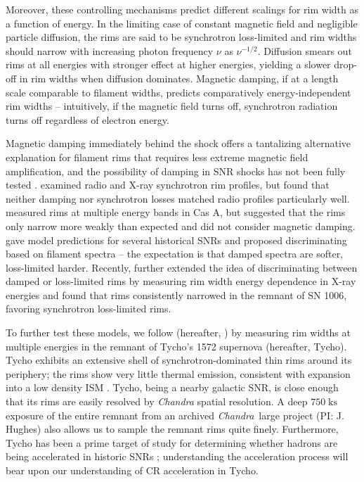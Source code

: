 \documentclass[iop, apj, numberedappendix, twocolappendix]{emulateapj}
\newcommand*{\mt}{\mathrm}
\newcommand*{\unit}[1]{\;\mt{#1}}  %
\newcommand*{\Chandra}{\textit{Chandra}\ }
\begin{document}
Moreover, these controlling mechanisms predict different scalings for rim width
as a function of energy.  In the limiting case of constant magnetic field and
negligible particle diffusion, the rims are said to be synchrotron loss-limited
and rim widths should narrow with increasing photon frequency $\nu$ as
$\nu^{-1/2}$. Diffusion smears out rims at all energies with stronger effect at
higher energies, yielding a slower drop-off in rim widths when diffusion
dominates.  Magnetic damping, if at a length scale comparable to filament
widths, predicts comparatively energy-independent rim widths -- intuitively, if
the magnetic field turns off, synchrotron radiation turns off regardless of
electron energy.

Magnetic damping immediately behind the shock offers a tantalizing alternative
explanation for filament rims that requires less extreme magnetic field
amplification, and the possibility of damping in SNR shocks has not been fully
tested \citep{pohl2005, marcowith2010}.  \citet{cassam-chenai2007} examined
radio and X-ray synchrotron rim profiles, but found that neither damping nor
synchrotron losses matched radio profiles particularly well.  \citet{araya2010}
measured rims at multiple energy bands in Cas A, but suggested that the rims
only narrow more weakly than expected and did not consider magnetic damping.
\citet{rettig2012} gave model predictions for several historical SNRs and
proposed discriminating based on filament spectra -- the expectation is that
damped spectra are softer, loss-limited harder.  Recently, \citet{ressler2014}
further extended the idea of discriminating between damped or loss-limited
rims by measuring rim width energy dependence in X-ray energies and found that
rims consistently narrowed in the remnant of SN 1006, favoring synchrotron
loss-limited rims.

To further test these models, we follow \citet{ressler2014} (hereafter,
) by measuring rim widths at multiple energies in the
remnant of Tycho's 1572 supernova (hereafter, Tycho).  Tycho exhibits an
extensive shell of synchrotron-dominated thin rims around its periphery; the
rims show very little thermal emission, consistent with expansion into a low
density ISM \citet{williams2013}.  Tycho, being a nearby galactic SNR, is close
enough that its rims are easily resolved by \textit{Chandra} spatial
resolution. A deep $750 \unit{ks}$ exposure of the entire remnant from an
archived \Chandra large project (PI: J. Hughes) also allows us to sample the
remnant rims quite finely.  Furthermore, Tycho has been a prime target of study
for determining whether hadrons are being accelerated in historic SNRs
\citep[and references therein]{morlino2012}; understanding the acceleration
process will bear upon our understanding of CR acceleration in Tycho.
\end{document}

